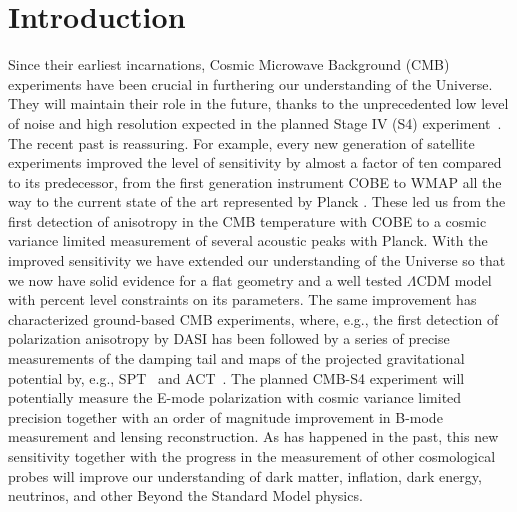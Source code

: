 \documentclass[aps,prd,reprint,superscriptaddress,nofootinbib]{revtex4-1}
\begin{document}
\section{Introduction}\label{sec:intro}
Since their earliest incarnations, Cosmic Microwave Background (CMB) experiments have been crucial in furthering our understanding of the Universe. They will maintain their role in the future, thanks to the unprecedented low level of noise and high resolution expected in the planned Stage IV (S4) experiment~\cite{2013arXiv1309.5383A}.
The recent past is reassuring. For example, every new generation of satellite experiments improved the level of sensitivity by almost a factor of ten compared to its predecessor, from the first generation instrument COBE to WMAP all the way to the current state of the art represented by Planck \cite{fixsen:1996,BlueBook2005, bennett:2003}. 
These led us from the first detection of anisotropy in the CMB temperature with COBE to a cosmic variance limited measurement of several acoustic peaks with Planck. With the improved sensitivity we have extended our understanding of the Universe so that we now have solid evidence for a flat geometry and a well tested $\Lambda$CDM model  with percent level constraints on its parameters.
The same improvement has characterized ground-based CMB experiments, where, e.g., the first detection of polarization anisotropy by DASI \cite{2002ApJ...568...38H} has been followed by a series of precise measurements of the damping tail and maps of the projected gravitational potential by, e.g., SPT~\cite{2011ApJ...743...28K} and ACT~\cite{2011ApJ...739...52D}.
The planned CMB-S4 experiment will potentially measure the E-mode polarization with cosmic variance limited precision together with an order of magnitude improvement in B-mode measurement and lensing reconstruction. As has happened in the past, this new sensitivity together with the progress in the measurement of other cosmological probes will improve our understanding of dark matter, inflation, dark energy, neutrinos, and other  Beyond the Standard Model physics.
\end{document}

